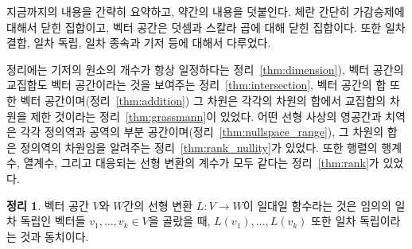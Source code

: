 \documentclass[unfonts,oneside,a4paper]{oblivoir}
\theoremstyle{definition}
\theoremstyle{theorem}
\newtheorem{theorem}{정리}
\theoremstyle{remark}
\theoremstyle{remark}
\theoremstyle{remark}
\theoremstyle{remark}
\renewcommand{\vec}[1]{\bm{\mathit{#1}}}
\begin{document}
지금까지의 내용을 간략히 요약하고, 약간의 내용을 덧붙인다.
체란 간단히 가감승제에 대해서 닫힌 집합이고, 벡터 공간은 덧셈과 스칼라 곱에 대해 닫힌 집합이다.
또한 일차 결합, 일차 독립, 일차 종속과 기저 등에 대해서 다루었다.

정리에는 기저의 원소의 개수가 항상 일정하다는 정리~\ref{thm:dimension}), 벡터 공간의 교집합도 벡터 공간이라는 것을 보여주는 정리~\ref{thm:intersection}, 벡터 공간의 합 또한 벡터 공간이며(정리~\ref{thm:addition}) 그 차원은 각각의 차원의 합에서 교집합의 차원을 제한 것이라는 정리~\ref{thm:grassmann}이 있었다.
어떤 선형 사상의 영공간과 치역은 각각 정의역과 공역의 부분 공간이며(정리~\ref{thm:nullspace_range}), 그 차원의 합은 정의역의 차원임을 알려주는 정리~\ref{thm:rank_nullity}가 있었다.
또한 행렬의 행계수, 열계수, 그리고 대응되는 선형 변환의 계수가 모두 같다는 정리~\ref{thm:rank}가 있었다.

\begin{theorem} \label{thm:image_independence}
    벡터 공간 $V$와 $W$간의 선형 변환 $L: V \rightarrow W$이 일대일 함수라는 것은 임의의 일차 독립인 벡터들 $\vec v_1, \dots, \vec v_k \in V$을 골랐을 때, $L(\vec v_1), \dots, L(\vec v_k)$ 또한 일차 독립이라는 것과 동치이다.
\end{theorem}
\end{document}
